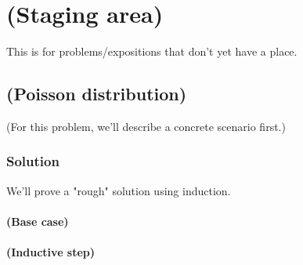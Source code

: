 
\chapter{(Staging area)}

This is for problems/expositions that don't yet have a place. 


\section{(Poisson distribution)}

(For this problem, we'll describe a concrete scenario first.)








\subsection{Solution}

We'll prove a "rough" solution using induction. 

\subsubsection{(Base case)}



\subsubsection{(Inductive step)}


